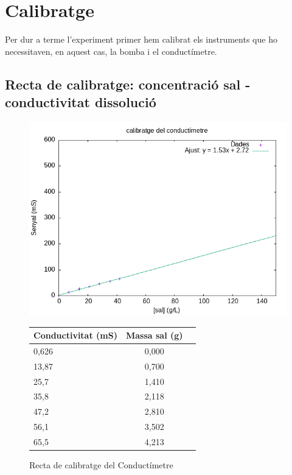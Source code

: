 \documentclass[10pt, twoside]{article}
\begin{document}
\section{Calibratge}
Per dur a terme l'experiment primer hem calibrat els instruments que ho necessitaven, en aquest cas, la bomba i el conductímetre. 

\subsection{Recta de calibratge: concentració sal - conductivitat dissolució}


\begin{figure}[hbt!]
    \centering
    \begin{minipage}{0.45\textwidth}
        \centering
        \includegraphics[width=0.9\linewidth]{calisal.png} %
        \caption{Recta de calibratge del Conductímetre}
        \label{fig:calisal}
    \end{minipage}%
    \hfill 
    \begin{minipage}{0.45\textwidth}
        \centering
        \label{tab:calisal}
        \begin{tabular}{|l|c|r|}
            \hline
            Conductivitat (mS)	&	Massa sal (g)	\\ \hline
            0,626	&	0,000	\\ \hline
            13,87	&	0,700	\\ \hline
            25,7	&	1,410	\\ \hline
            35,8	&	2,118	\\ \hline
            47,2	&	2,810	\\ \hline
            56,1	&	3,502	\\ \hline
            65,5	&	4,213	\\ \hline
                          
        \end{tabular}
    \end{minipage}

\end{figure}
\end{document}
